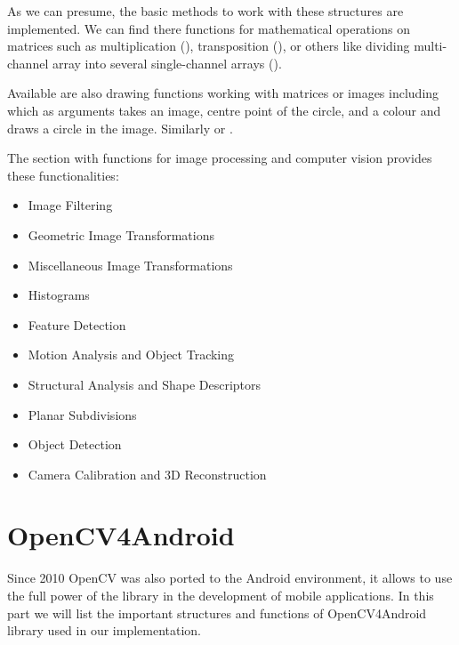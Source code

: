 As we can presume, the basic methods to work with these structures are implemented.
We can find there functions for mathematical operations on matrices such as multiplication (), transposition (), or
others like dividing multi-channel array into several single-channel arrays ().

Available are also drawing functions working with matrices or images including  which as arguments takes an image, centre point of the circle,
and a colour and draws a circle in the image. Similarly  or .


The section with functions for image processing and computer vision provides these functionalities:
\begin{itemize}

  \item Image Filtering
  \item Geometric Image Transformations
  \item Miscellaneous Image Transformations
  \item Histograms
  \item Feature Detection
  \item Motion Analysis and Object Tracking
  \item Structural Analysis and Shape Descriptors
  \item Planar Subdivisions
  \item Object Detection
  \item Camera Calibration and 3D Reconstruction

\end{itemize}



\section{OpenCV4Android}

Since 2010 OpenCV was also ported to the Android environment, it allows to use the full power of the library in the development of mobile applications.
In this part we will list the important structures and functions of OpenCV4Android library used in our implementation.

